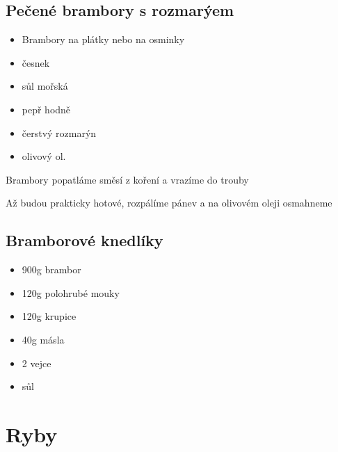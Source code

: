 \documentclass[10pt,a4paper]{article}
\newenvironment{myitemize}
{ \begin{itemize}
    \setlength{\itemsep}{0pt}
    \setlength{\parskip}{0pt}
    \setlength{\parsep}{0pt}     }
{ \end{itemize}                  }
\begin{document}
\subsection{Pečené brambory s rozmarýem}
\begin{minipage}[t]{0,5\textwidth}
\begin{myitemize} 
\item Brambory na plátky nebo na osminky
\item česnek 
\item sůl mořská
\item pepř hodně 
\item čerstvý rozmarýn
\item olivový ol.
\end{myitemize}
\end{minipage}
\begin{minipage}[t]{0,5\textwidth}
Brambory popatláme směsí z koření a vrazíme do trouby

Až budou prakticky hotové, rozpálíme pánev a na olivovém oleji osmahneme
\end{minipage}

\subsection{Bramborové knedlíky}
\begin{minipage}[t]{0,5\textwidth}
\begin{myitemize} 
\item 900g brambor
\item 120g polohrubé mouky
\item 120g krupice
\item 40g másla
\item 2 vejce
\item sůl
\end{myitemize}
\end{minipage}
\begin{minipage}[t]{0,5\textwidth}

\end{minipage}
\pagebreak
\section{Ryby}
\end{document}
